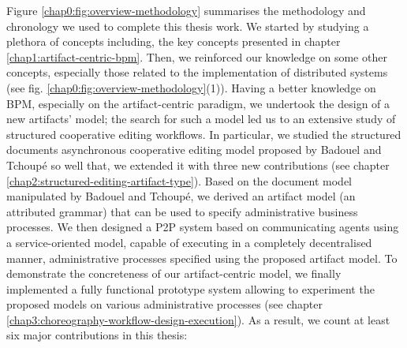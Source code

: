 Figure \ref{chap0:fig:overview-methodology} summarises the methodology and chronology we used to complete this thesis work. We started by studying a plethora of concepts including, the key concepts presented in chapter \ref{chap1:artifact-centric-bpm}. Then, we reinforced our knowledge on some other concepts, especially those related to the implementation of distributed systems (see fig. \ref{chap0:fig:overview-methodology}(1)). Having a better knowledge on BPM, especially on the artifact-centric paradigm, we undertook the design of a new artifacts' model; the search for such a model led us to an extensive study of structured cooperative editing workflows. In particular, we studied the structured documents asynchronous cooperative editing model proposed by Badouel and Tchoup\'e \citeyearpar{badouelTchoupeCmcs} so well that, we extended it with three new contributions (see chapter \ref{chap2:structured-editing-artifact-type}). Based on the document model manipulated by Badouel and Tchoup\'e, we derived an artifact model (an attributed grammar) that can be used to specify administrative business processes. We then designed a P2P system based on communicating agents using a service-oriented model, capable of executing in a completely decentralised manner, administrative processes specified using the proposed artifact model. To demonstrate the concreteness of our artifact-centric model, we finally implemented a fully functional prototype system allowing to experiment the proposed models on various administrative processes (see chapter \ref{chap3:choreography-workflow-design-execution}). As a result, we count at least six major contributions in this thesis:
